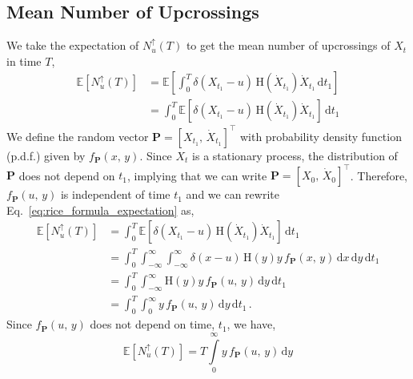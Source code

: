 \documentclass[journal]{IEEEtran}
\theoremstyle{plain}
\theoremstyle{definition}
\theoremstyle{remark}
\newcommand{\E}{\mathbb{E}}
\newcommand{\Nup}{N_u^{\uparrow}(T)}
\newcommand{\dd}{\mathrm{d}}
\begin{document}
\subsection{Mean Number of Upcrossings} 
\label{section:appendix_upcrossing_mean}
We take the expectation of $\Nup$ to get the mean number of upcrossings of $X_t$ in time $T$,
\begin{equation}
\begin{split}
    \E\left[\Nup\right] &= \E\left[ \int_0^T \delta\left(X_{t_1} - u\right) \, \mathrm{H}\left(\dot{X}_{t_1}\right) \dot{X}_{t_1} \, \dd t_1 \right]  \\
    &= \int_0^T \E\left[\delta\left(X_{t_1} - u\right) \, \mathrm{H}\left(\dot{X}_{t_1}\right) \dot{X}_{t_1} \right] \, \dd t_1 
\end{split} \label{eq:rice_formula_expectation}
\end{equation}
We define the random vector $\mathbf{P} = [X_{t_1}, \, \dot{X}_{t_1}]^\top$ with probability density function (p.d.f.) given by $f_{\mathbf{P}}(x,\,y)$. Since $X_{t}$ is a stationary process, the distribution of $\mathbf{P}$ does not depend on $t_1$, implying that we can write $\mathbf{P} = [X_{0}, \, \dot{X}_{0}]^\top$. Therefore, $f_{\mathbf{P}}(u,\,y)$ is independent of time $t_1$ and we can rewrite 
Eq.~\eqref{eq:rice_formula_expectation} as,
\begin{equation}
\begin{split}
    \E\left[\Nup\right] &= \int_0^T \E\left[\delta\left(X_{t_1} - u\right) \, \mathrm{H}\left(\dot{X}_{t_1}\right) \dot{X}_{t_1} \right] \, \dd t_1 \\
    &= \int_0^T \int_{-\infty}^\infty \int_{-\infty}^\infty \delta\left(x - u\right) \, \mathrm{H}\left(y \right) y\, f_{\mathbf{P}}(x,\,y) \, \dd x \, \dd y \, \dd t_1 \\
    &= \int_0^T \int_{-\infty}^\infty  \mathrm{H}\left(y \right) y\, f_{\mathbf{P}}(u,\,y) \, \dd y \, \dd t_1 \\
    &= \int_0^T \int_{0}^\infty y\, f_{\mathbf{P}}(u,\,y) \, \dd y \, \dd t_1\, .
\end{split} \label{eq:rice_formula_defn_double_integral}
\end{equation}
Since $f_{\mathbf{P}}(u,\,y)$ does not depend on time, $t_1$, we have,
\begin{equation}
    \E\left[\Nup\right] = T \int\limits_{0}^\infty y\, f_{\mathbf{P}}(u,\,y) \, \dd y  \label{eq:rice_formula_boxed}
\end{equation}
\end{document}

